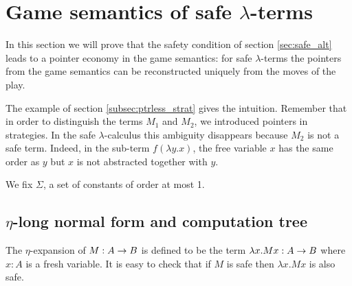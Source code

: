 \def\cmptre#1{\tau(#1)}
\def\aux#1{\lceil #1\rceil}
\def\nf#1{\eta_{\sf nf}(#1)}

\section{Game semantics of safe $\lambda$-terms}

In this section we will prove that the safety condition
of section \ref{sec:safe_alt} leads to a pointer economy in the game
semantics: for safe $\lambda$-terms the pointers from the game semantics can be reconstructed uniquely from the moves of
the play.

The example of section \ref{subsec:ptrless_strat} gives the intuition.
Remember that in order to distinguish the terms $M_1$ and $M_2$,
we introduced pointers in strategies. In the safe $\lambda$-calculus
this ambiguity disappears because $M_2$ is not a safe term. Indeed, in the
sub-term $f (\lambda y . x)$, the free variable $x$
has the same order as $y$ but $x$ is not abstracted together
with $y$.

We fix $\Sigma$, a set of constants of order at most 1.
%
%






\subsection{$\eta$-long normal form and computation tree}

The $\eta$-expansion of $M: A\rightarrow B$ is defined to be the term $\lambda x . M x : A\rightarrow B$ where $x:A$ is a fresh variable.
It is easy to check that if $M$ is safe then $\lambda x . M x$ is also safe.

